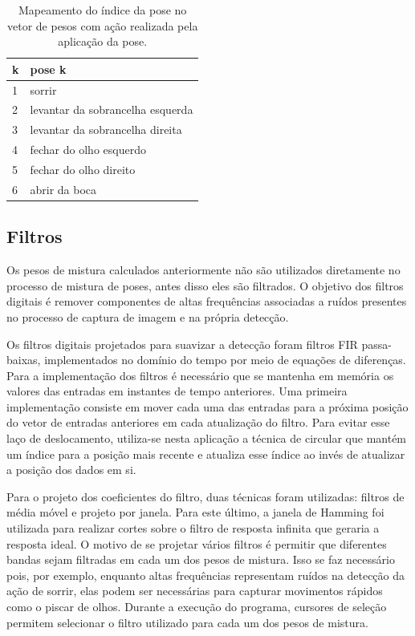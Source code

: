 \begin{table}[!htb]
\centering
\begin{tabular}{|l|l|}
\hline
k & pose k  \\ \hline
1 & sorrir  \\ \hline
2 & levantar da sobrancelha esquerda\\ \hline
3 & levantar da sobrancelha direita \\ 	\hline
4 & fechar do olho esquerdo  \\ \hline
5 & fechar do olho direito \\ \hline
6 & abrir da boca  \\ \hline
\end{tabular}
\caption{Mapeamento do índice da pose no vetor de pesos com ação realizada pela aplicação da pose.}
\label{tab:poses-descr}
\end{table}



\subsection{Filtros}

Os pesos de mistura calculados anteriormente não são utilizados diretamente no
processo de mistura de poses, antes disso eles são filtrados. O objetivo dos
filtros digitais é remover componentes de altas frequências associadas a ruídos
presentes no processo de captura de imagem e na própria detecção. 

Os filtros digitais projetados para suavizar a detecção foram filtros FIR
passa-baixas, implementados no domínio do tempo por meio de equações de
diferenças. Para a implementação dos filtros é necessário que se mantenha em
memória os valores das entradas em instantes de tempo anteriores. Uma primeira
implementação consiste em mover cada uma das entradas para a próxima posição do
vetor de entradas anteriores em cada atualização do filtro. Para evitar esse
laço de deslocamento, utiliza-se nesta aplicação a técnica de 
circular que mantém um índice para a posição mais recente e atualiza esse índice
ao invés de atualizar a posição dos dados em si.


Para o projeto dos coeficientes do filtro, duas técnicas foram utilizadas:
filtros de média móvel e projeto por janela. Para este último, a janela de
Hamming foi utilizada para realizar cortes sobre o filtro de resposta infinita
que geraria a resposta ideal. O motivo de se projetar vários filtros é permitir
que diferentes bandas sejam filtradas em cada um dos pesos de mistura. Isso se
faz necessário pois, por exemplo, enquanto altas frequências representam ruídos
na detecção da ação de sorrir, elas podem ser necessárias para capturar
movimentos rápidos como o piscar de olhos. Durante a execução do programa,
cursores de seleção permitem selecionar o filtro utilizado para cada um dos
pesos de mistura.

